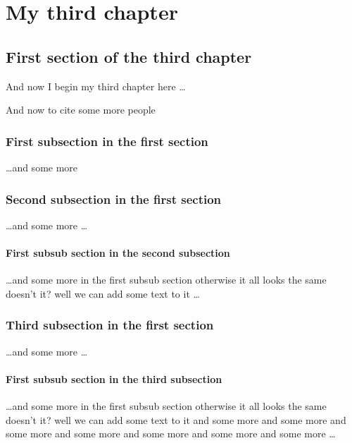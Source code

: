 \chapter{My third chapter}

\ifpdf
    \graphicspath{{Chapter3/Figs/Raster/}{Chapter3/Figs/PDF/}{Chapter3/Figs/}}
\else
    \graphicspath{{Chapter3/Figs/Vector/}{Chapter3/Figs/}}
\fi

\section{First section of the third chapter}
And now I begin my third chapter here \dots

And now to cite some more people~\citep{Rea85,Ancey1996}

\subsection{First subsection in the first section}
\dots and some more 

\subsection{Second subsection in the first section}
\dots and some more \dots



\subsubsection{First subsub section in the second subsection}
\dots and some more in the first subsub section otherwise it all looks the same
doesn't it? well we can add some text to it \dots

\subsection{Third subsection in the first section}
\dots and some more \dots

\subsubsection{First subsub section in the third subsection}
\dots and some more in the first subsub section otherwise it all looks the same
doesn't it? well we can add some text to it and some more and some more and
some more and some more and some more and some more and some more \dots

